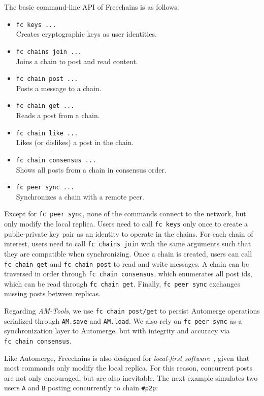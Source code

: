 \documentclass[12pt]{article}
\newcommand{\AMT}      {\emph{AM-Tools}\xspace}
\newcommand{\code}[1]  {\texttt{\footnotesize{#1}}}
\begin{document}
The basic command-line API of Freechains is as follows:

\begin{itemize}
\item \code{fc keys ...} \\
    Creates cryptographic keys as user identities.
\item \code{fc chains join ...} \\
    Joins a chain to post and read content.
\item \code{fc chain post ...} \\
    Posts a message to a chain.
\item \code{fc chain get ...} \\
    Reads a post from a chain.
\item \code{fc chain like ...} \\
    Likes (or dislikes) a post in the chain.
\item \code{fc chain consensus ...} \\
    Shows all posts from a chain in consensus order.
\item \code{fc peer sync ...} \\
    Synchronizes a chain with a remote peer.
\end{itemize}

Except for \code{fc~peer~sync}, none of the commands connect to the network,
but only modify the local replica.
%
Users need to call \code{fc~keys} only once to create a public-private key pair
as an identity to operate in the chains.
%
For each chain of interest, users need to call \code{fc~chains~join} with the
same arguments such that they are compatible when synchronizing.
%
Once a chain is created, users can call \code{fc~chain~get} and
\code{fc~chain~post} to read and write messages.
%
A chain can be traversed in order through \code{fc~chain~consensus}, which
enumerates all post ids, which can be read through \code{fc~chain~get}.
%
Finally, \code{fc~peer~sync} exchanges missing posts between replicas.

Regarding \AMT, we use \code{fc~chain~post/get} to persist Automerge operations
serialized through \code{AM.save} and \code{AM.load}.
We also rely on \code{fc~peer~sync} as a synchronization layer to Automerge,
but with integrity and accuracy via \code{fc~chain~consensus}.

Like Automerge, Freechains is also designed for
\emph{local-first software}~\cite{p2p.local}, given that most commands only
modify the local replica.
For this reason, concurrent posts are not only encouraged, but are also
inevitable.
The next example simulates two users \code{A} and \code{B} posting concurrently
to chain \code{\#p2p}:
\end{document}
